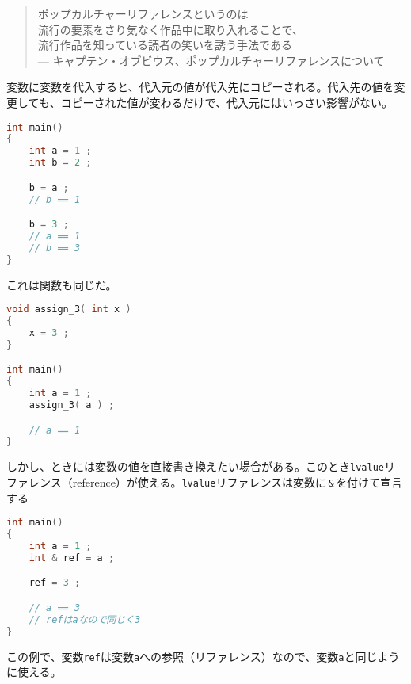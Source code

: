 
\begin{quote}
\begin{flushright}
ポップカルチャーリファレンスというのは\\
流行の要素をさり気なく作品中に取り入れることで、\\
流行作品を知っている読者の笑いを誘う手法である\\
--- キャプテン・オブビウス、ポップカルチャーリファレンスについて
\end{flushright}
\end{quote}


変数に変数を代入すると、代入元の値が代入先にコピーされる。代入先の値を変更しても、コピーされた値が変わるだけで、代入元にはいっさい影響がない。

\begin{lstlisting}[language={C++}]
int main()
{
    int a = 1 ;
    int b = 2 ;

    b = a ;
    // b == 1

    b = 3 ;
    // a == 1
    // b == 3
}
\end{lstlisting}

\ifTombow\pagebreak\fi
これは関数も同じだ。

\begin{lstlisting}[language={C++}]
void assign_3( int x )
{
    x = 3 ;
}

int main()
{
    int a = 1 ;
    assign_3( a ) ;

    // a == 1
}
\end{lstlisting}

しかし、ときには変数の値を直接書き換えたい場合がある。このとき\texttt{lvalue}リファレンス（reference）が使える。\texttt{lvalue}リファレンスは変数に\,\texttt{\&}\,を付けて宣言する

\begin{lstlisting}[language={C++}]
int main()
{
    int a = 1 ;
    int & ref = a ;

    ref = 3 ;

    // a == 3
    // refはaなので同じく3
}
\end{lstlisting}

この例で、変数\texttt{ref}は変数\texttt{a}への参照（リファレンス）なので、変数\texttt{a}と同じように使える。

